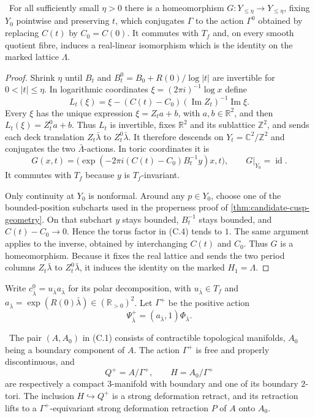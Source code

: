 \begin{lemma}\label{lem:collapse-straightening}
\Verified\ For all sufficiently small $\eta>0$ there is a homeomorphism
$G:Y_{\leq\eta}\to Y_{\leq\eta}$, fixing $Y_0$ pointwise and preserving
$t$, which conjugates $\Gamma$ to the action $\Gamma^0$ obtained by replacing
$C(t)$ by $C_0=C(0)$.  It commutes with $T_f$ and, on every smooth quotient
fibre, induces a real-linear isomorphism which is the identity on the marked
lattice $\Lambda$.
\end{lemma}

\begin{proof}
Shrink $\eta$ until $B_t$ and
$B_t^0=B_0+R(0)/\log|t|$ are invertible for $0<|t|\leq\eta$.  In logarithmic
coordinates $\xi=(2\pi i)^{-1}\log x$ define
\[
 L_t(\xi)=\xi-(C(t)-C_0)(\operatorname{Im}Z_t)^{-1}
                         \operatorname{Im}\xi.
\tag{C.3}
\]
Every $\xi$ has the unique expression $\xi=Z_ta+b$, with
$a,b\in\mathbb R^2$, and then $L_t(\xi)=Z_t^0a+b$.  Thus $L_t$ is invertible,
fixes $\mathbb R^2$ and its sublattice $\mathbb Z^2$, and sends each deck
translation $Z_t\bar\lambda$ to $Z_t^0\bar\lambda$.  It therefore descends
on $Y_t=\mathbb C^2/\mathbb Z^2$ and conjugates the two $\bar\Lambda$-actions.
In toric coordinates it is
\[
 G(x,t)=\bigl(\exp(-2\pi i(C(t)-C_0)B_t^{-1}y)x,t\bigr),
 \qquad G|_{Y_0}=\operatorname{id}.
\tag{C.4}
\]
It commutes with $T_f$ because $y$ is $T_f$-invariant.

Only continuity at $Y_0$ is nonformal.  Around any $p\in Y_0$, choose one of
the bounded-position subcharts used in the properness proof of
\cref{thm:candidate-cusp-geometry}.  On that subchart $y$ stays bounded,
$B_t^{-1}$ stays bounded, and $C(t)-C_0\to0$.  Hence the torus factor in
(C.4) tends to $1$.  The same argument applies to the inverse, obtained by
interchanging $C(t)$ and $C_0$.  Thus $G$ is a homeomorphism.  Because it
fixes the real lattice and sends the two period columns $Z_t\bar\lambda$ to
$Z_t^0\bar\lambda$, it induces the identity on the marked $H_1=\Lambda$.
\end{proof}

Write $c^0_{\bar\lambda}=u_{\bar\lambda}a_{\bar\lambda}$ for its polar
decomposition, with $u_{\bar\lambda}\in T_f$ and
$a_{\bar\lambda}=\exp(R(0)\bar\lambda)\in(\mathbb R_{>0})^2$.  Let
$\Gamma^+$ be the positive action
\[
 \Psi^+_{\bar\lambda}=(a_{\bar\lambda},1)\Phi_{\bar\lambda}.
\tag{C.5}
\]

\begin{lemma}\label{lem:positive-collapse}
\Verified\ The pair $(A,A_0)$ in (C.1) consists of contractible topological
manifolds, $A_0$ being a boundary component of $A$.  The action $\Gamma^+$ is
free and properly discontinuous, and
\[
 Q^+=A/\Gamma^+,\qquad H=A_0/\Gamma^+
\tag{C.6}
\]
are respectively a compact $3$-manifold with boundary and one of its boundary
$2$-tori.  The inclusion $H\hookrightarrow Q^+$ is a strong deformation
retract, and its retraction lifts to a $\Gamma^+$-equivariant strong
deformation retraction $P$ of $A$ onto $A_0$.
\end{lemma}

